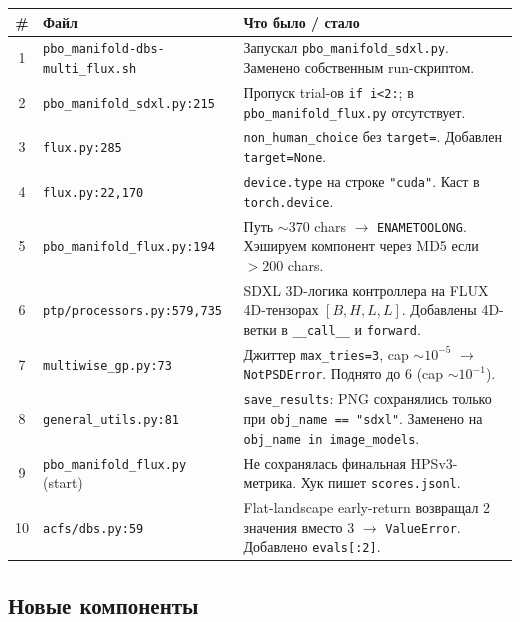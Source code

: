 \documentclass[11pt,a4paper]{article}
\begin{document}
\renewcommand{\arraystretch}{1.15}
\footnotesize
\begin{tabularx}{\textwidth}{c l X}
\toprule
\# & Файл & Что было / стало \\
\midrule
1  & \texttt{pbo\_manifold-dbs-multi\_flux.sh} & Запускал \texttt{pbo\_manifold\_sdxl.py}. Заменено собственным run-скриптом. \\
2  & \texttt{pbo\_manifold\_sdxl.py:215}       & Пропуск trial-ов \texttt{if i<2:}; в \texttt{pbo\_manifold\_flux.py} отсутствует. \\
3  & \texttt{flux.py:285}                      & \texttt{non\_human\_choice} без \texttt{target=}. Добавлен \texttt{target=None}. \\
4  & \texttt{flux.py:22,170}                   & \texttt{device.type} на строке \texttt{"cuda"}. Каст в \texttt{torch.device}. \\
5  & \texttt{pbo\_manifold\_flux.py:194}       & Путь $\sim$370 chars $\to$ \texttt{ENAMETOOLONG}. Хэшируем компонент через MD5 если $>200$ chars. \\
6  & \texttt{ptp/processors.py:579,735}        & SDXL 3D-логика контроллера на FLUX 4D-тензорах $[B,H,L,L]$. Добавлены 4D-ветки в \texttt{\_\_call\_\_} и \texttt{forward}. \\
7  & \texttt{multiwise\_gp.py:73}              & Джиттер \texttt{max\_tries=3}, cap $\sim\!10^{-5}$ $\to$ \texttt{NotPSDError}. Поднято до 6 (cap $\sim\!10^{-1}$). \\
8  & \texttt{general\_utils.py:81}             & \texttt{save\_results}: PNG сохранялись только при \texttt{obj\_name == "sdxl"}. Заменено на \texttt{obj\_name in image\_models}. \\
9  & \texttt{pbo\_manifold\_flux.py} (start)   & Не сохранялась финальная HPSv3-метрика. Хук пишет \texttt{scores.jsonl}. \\
10 & \texttt{acfs/dbs.py:59}                   & Flat-landscape early-return возвращал 2 значения вместо 3 $\to$ \texttt{ValueError}. Добавлено \texttt{evals[:2]}. \\
\bottomrule
\end{tabularx}
\normalsize

\subsection{Новые компоненты}
\end{document}
